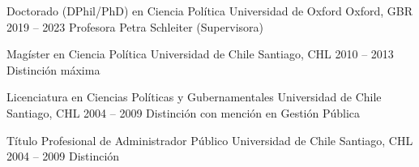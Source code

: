 





\begin{cventries}

\vspace{0.5mm}
\cventry
{Doctorado (DPhil/PhD) en Ciencia Política} 
{Universidad de Oxford} 
{Oxford, GBR} 
{2019 -- 2023} 
{Profesora Petra Schleiter (Supervisora)} \vspace{1.5mm}

\cventry
{Magíster en Ciencia Política} 
{Universidad de Chile} 
{Santiago, CHL} 
{2010 -- 2013} 
{Distinción máxima} \vspace{1.5mm}

\cventry
{Licenciatura en Ciencias Políticas y Gubernamentales} 
{Universidad de Chile} 
{Santiago, CHL} 
{2004 -- 2009} 
{Distinción con mención en Gestión Pública} \vspace{1.5mm}

\cventry
{Título Profesional de Administrador Público} 
{Universidad de Chile} 
{Santiago, CHL} 
{2004 -- 2009} 
{Distinción}\vspace{1.5mm}

\end{cventries}
